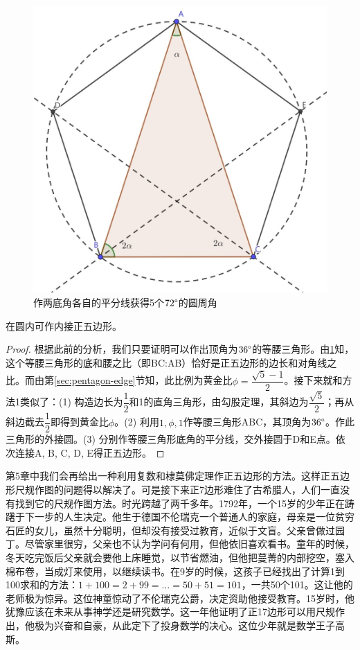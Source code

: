 \documentclass[b5paper]{ctexart}
\begin{document}
\begin{figure}[htbp]
 \centering
 \includegraphics[scale=0.35]{img/triangle-pentagon}
 \caption{作两底角各自的平分线获得5个$72\degree$的圆周角}
 \label{fig:triangle-pentagon}
\end{figure}

\begin{proposition}[欧几里得《原本》，卷4，命题11]
在圆内可作内接正五边形。
\end{proposition}

\begin{proof}
根据此前的分析，我们只要证明可以作出顶角为$36\degree$的等腰三角形。由\cref{fig:triangle-pentagon}知，这个等腰三角形的底和腰之比（即BC:AB）恰好是正五边形的边长和对角线之比。而由第\ref{sec:pentagon-edge}节知，此比例为黄金比$\phi = \dfrac{\sqrt{5} - 1}{2}$。接下来就和方法1类似了：(1) 构造边长为$\dfrac{1}{2}$和1的直角三角形，由勾股定理，其斜边为$\dfrac{\sqrt{5}}{2}$；再从斜边截去$\dfrac{1}{2}$即得到黄金比$\phi$。(2) 利用$1, \phi, 1$作等腰三角形ABC，其顶角为$36\degree$。作此三角形的外接圆。(3) 分别作等腰三角形底角的平分线，交外接圆于D和E点。依次连接A, B, C, D, E得正五边形。
\end{proof}

第5章中我们会再给出一种利用复数和棣莫佛定理作正五边形的方法。这样正五边形尺规作图的问题得以解决了。可是接下来正7边形难住了古希腊人，人们一直没有找到它的尺规作图方法。时光跨越了两千多年。1792年，一个15岁的少年正在踌躇于下一步的人生决定。他生于德国不伦瑞克一个普通人的家庭，母亲是一位贫穷石匠的女儿，虽然十分聪明，但却没有接受过教育，近似于文盲。父亲曾做过园丁。尽管家里很穷，父亲也不认为学问有何用，但他依旧喜欢看书。童年的时候，冬天吃完饭后父亲就会要他上床睡觉，以节省燃油，但他把蔓菁的内部挖空，塞入棉布卷，当成灯来使用，以继续读书。在9岁的时候，这孩子已经找出了计算1到100求和的方法：$1 + 100 = 2 + 99 = \dotso = 50 + 51 = 101$，一共50个101。这让他的老师极为惊异。这位神童惊动了不伦瑞克公爵，决定资助他接受教育。15岁时，他犹豫应该在未来从事神学还是研究数学。这一年他证明了正17边形可以用尺规作出\cite{Gauss-Britannia-2025}，他极为兴奋和自豪，从此定下了投身数学的决心。这位少年就是数学王子高斯。
\end{document}
